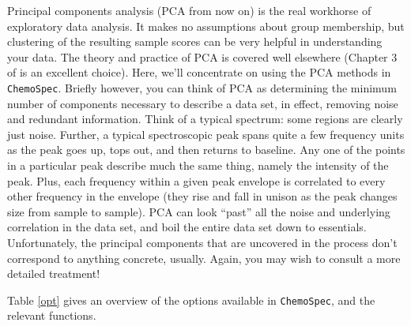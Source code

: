 \documentclass[letter,10pt,twocolumn,twoside,printwatermark=false]{pinp}
\begin{document}
\label{sec-pca} Principal components analysis (PCA from now on) is the
real workhorse of exploratory data analysis. It makes no assumptions
about group membership, but clustering of the resulting sample scores
can be very helpful in understanding your data. The theory and practice
of PCA is covered well elsewhere (Chapter 3 of \cite{Filzmoser2009} is
an excellent choice). Here, we'll concentrate on using the PCA methods
in \texttt{ChemoSpec}. Briefly however, you can think of PCA as
determining the minimum number of components necessary to describe a
data set, in effect, removing noise and redundant information. Think of
a typical spectrum: some regions are clearly just noise. Further, a
typical spectroscopic peak spans quite a few frequency units as the peak
goes up, tops out, and then returns to baseline. Any one of the points
in a particular peak describe much the same thing, namely the intensity
of the peak. Plus, each frequency within a given peak envelope is
correlated to every other frequency in the envelope (they rise and fall
in unison as the peak changes size from sample to sample). PCA can look
``past'' all the noise and underlying correlation in the data set, and
boil the entire data set down to essentials. Unfortunately, the
principal components that are uncovered in the process don't correspond
to anything concrete, usually. Again, you may wish to consult a more
detailed treatment!

Table \ref{opt} gives an overview of the options available in
\texttt{ChemoSpec}, and the relevant functions.
\end{document}
